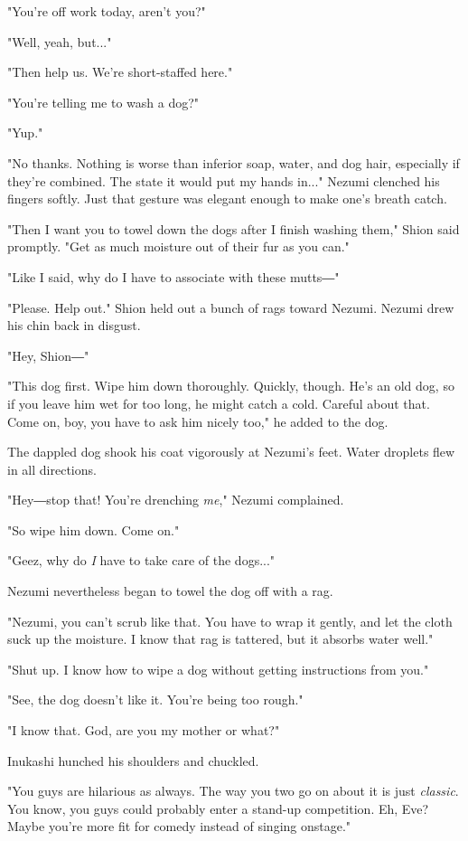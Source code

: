 "You're off work today, aren't you?"

"Well, yeah, but..."

"Then help us. We're short-staffed here."

"You're telling me to wash a dog?"

"Yup."

"No thanks. Nothing is worse than inferior soap, water, and dog hair,
especially if they're combined. The state it would put my hands in..."
Nezumi clenched his fingers softly. Just that gesture was elegant enough
to make one's breath catch.

"Then I want you to towel down the dogs after I finish washing them,"
Shion said promptly. "Get as much moisture out of their fur as you can."

"Like I said, why do I have to associate with these mutts―"

"Please. Help out." Shion held out a bunch of rags toward Nezumi. Nezumi
drew his chin back in disgust.

"Hey, Shion―"

"This dog first. Wipe him down thoroughly. Quickly, though. He's an old
dog, so if you leave him wet for too long, he might catch a cold.
Careful about that. Come on, boy, you have to ask him nicely too," he
added to the dog.

The dappled dog shook his coat vigorously at Nezumi's feet. Water
droplets flew in all directions.

"Hey―stop that! You're drenching \emph{me}," Nezumi complained.

"So wipe him down. Come on."

"Geez, why do \emph{I} have to take care of the dogs..."

Nezumi nevertheless began to towel the dog off with a rag.

"Nezumi, you can't scrub like that. You have to wrap it gently, and let
the cloth suck up the moisture. I know that rag is tattered, but it
absorbs water well."

"Shut up. I know how to wipe a dog without getting instructions from
you."

"See, the dog doesn't like it. You're being too rough."

"I know that. God, are you my mother or what?"

Inukashi hunched his shoulders and chuckled.

"You guys are hilarious as always. The way you two go on about it is
just \emph{classic}. You know, you guys could probably enter a stand-up
competition. Eh, Eve? Maybe you're more fit for comedy instead of
singing onstage."

